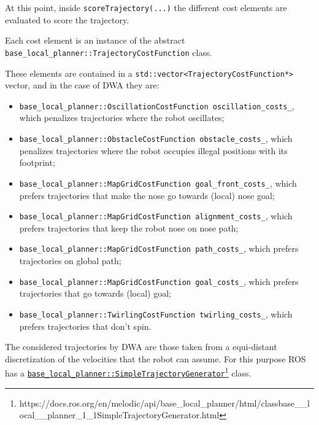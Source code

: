 \documentclass[11pt,a4paper]{article}
\begin{document}
At this point, inside \texttt{scoreTrajectory(...)} the different cost elements are evaluated to score the trajectory.

Each cost element is an instance of the abstract \texttt{base\_local\_planner::TrajectoryCostFunction} class.

These elements are contained in a \texttt{std::vector<TrajectoryCostFunction*>} vector, and in the case of DWA they are:
\begin{itemize}
 \item \texttt{base\_local\_planner::OscillationCostFunction oscillation\_costs\_}, which penalizes trajectories where the robot oscillates;
 \item \texttt{base\_local\_planner::ObstacleCostFunction obstacle\_costs\_}, which penalizes trajectories where the robot occupies illegal positions with its footprint;
 \item \texttt{base\_local\_planner::MapGridCostFunction goal\_front\_costs\_}, which prefers  trajectories that make the nose go towards (local) nose goal;
 \item \texttt{base\_local\_planner::MapGridCostFunction alignment\_costs\_}, which prefers trajectories that keep the robot nose on nose path;
 \item \texttt{base\_local\_planner::MapGridCostFunction path\_costs\_}, which prefers trajectories on global path;
 \item \texttt{base\_local\_planner::MapGridCostFunction goal\_costs\_}, which prefers trajectories that go towards (local) goal;
 \item \texttt{base\_local\_planner::TwirlingCostFunction twirling\_costs\_}, which prefers trajectories that don't spin.\\
\end{itemize}

The considered trajectories by DWA are those taken from a equi-distant discretization of the velocities that the robot can assume. For this purpose ROS has a \href{https://docs.ros.org/en/melodic/api/base\_local\_planner/html/classbase\_\_local\_\_planner\_1\_1SimpleTrajectoryGenerator.html}{\texttt{base\_local\_planner::SimpleTrajectoryGenerator}}\footnote{https://docs.ros.org/en/melodic/api/base\_local\_planner/html/classbase\_\_local\_\_planner\_1\_1SimpleTrajectoryGenerator.html} class.



\end{document}
